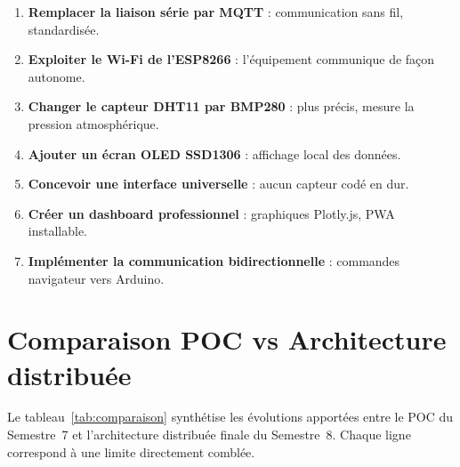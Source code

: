 \documentclass[12pt, a4paper]{report}
\begin{document}
\begin{keybox}
\begin{enumerate}[leftmargin=1cm, itemsep=5pt]
  \item \textbf{Remplacer la liaison s\'erie par MQTT} :
        communication sans fil, standardis\'ee.
  \item \textbf{Exploiter le Wi-Fi de l'ESP8266} :
        l'\'equipement communique de fa\c{c}on autonome.
  \item \textbf{Changer le capteur DHT11 par BMP280} :
        plus pr\'ecis, mesure la pression atmosph\'erique.
  \item \textbf{Ajouter un \'ecran OLED SSD1306} :
        affichage local des donn\'ees.
  \item \textbf{Concevoir une interface universelle} :
        aucun capteur cod\'e en dur.
  \item \textbf{Cr\'eer un dashboard professionnel} :
        graphiques Plotly.js, PWA installable.
  \item \textbf{Impl\'ementer la communication bidirectionnelle} :
        commandes navigateur vers Arduino.
\end{enumerate}
\end{keybox}

\section{Comparaison POC vs Architecture distribu\'ee}

Le tableau~\ref{tab:comparaison} synth\'etise les \'evolutions
apport\'ees entre le POC du Semestre~7 et l'architecture distribu\'ee
finale du Semestre~8. Chaque ligne correspond \`a une limite
directement combl\'ee.
\end{document}
